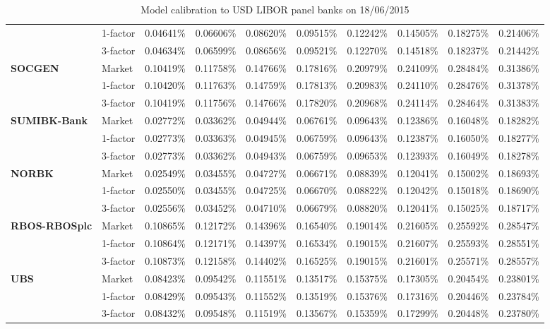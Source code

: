 \documentclass[12pt,a4paper]{article}
\theoremstyle{plain}
\numberwithin{equation}{section}
\begin{document}
\begin{table}[t]
{\begin{tabular}{|rl|cccccccc|}
          & 1-factor & 0.04641\% & 0.06606\% & 0.08620\% & 0.09515\% & 0.12242\% & 0.14505\% & 0.18275\% & 0.21406\% \\
          & 3-factor & 0.04634\% & 0.06599\% & 0.08656\% & 0.09521\% & 0.12270\% & 0.14518\% & 0.18237\% & 0.21442\% \\
    \midrule
    \midrule
    \multicolumn{1}{|l}{\textbf{SOCGEN}} & Market & 0.10419\% & 0.11758\% & 0.14766\% & 0.17816\% & 0.20979\% & 0.24109\% & 0.28484\% & 0.31386\% \\
\cmidrule{3-10}          & 1-factor & 0.10420\% & 0.11763\% & 0.14759\% & 0.17813\% & 0.20983\% & 0.24110\% & 0.28476\% & 0.31378\% \\
          & 3-factor & 0.10419\% & 0.11756\% & 0.14766\% & 0.17820\% & 0.20968\% & 0.24114\% & 0.28464\% & 0.31383\% \\
    \midrule
    \midrule
    \multicolumn{1}{|l}{\textbf{SUMIBK-Bank}} & Market & 0.02772\% & 0.03362\% & 0.04944\% & 0.06761\% & 0.09643\% & 0.12386\% & 0.16048\% & 0.18282\% \\
\cmidrule{3-10}          & 1-factor & 0.02773\% & 0.03363\% & 0.04945\% & 0.06759\% & 0.09643\% & 0.12387\% & 0.16050\% & 0.18277\% \\
          & 3-factor & 0.02773\% & 0.03362\% & 0.04943\% & 0.06759\% & 0.09653\% & 0.12393\% & 0.16049\% & 0.18278\% \\
    \midrule
    \midrule
    \multicolumn{1}{|l}{\textbf{NORBK}} & Market & 0.02549\% & 0.03455\% & 0.04727\% & 0.06671\% & 0.08839\% & 0.12041\% & 0.15002\% & 0.18693\% \\
\cmidrule{3-10}          & 1-factor & 0.02550\% & 0.03455\% & 0.04725\% & 0.06670\% & 0.08822\% & 0.12042\% & 0.15018\% & 0.18690\% \\
          & 3-factor & 0.02556\% & 0.03452\% & 0.04710\% & 0.06679\% & 0.08820\% & 0.12041\% & 0.15025\% & 0.18717\% \\
    \midrule
    \midrule
    \multicolumn{1}{|l}{\textbf{RBOS-RBOSplc}} & Market & 0.10865\% & 0.12172\% & 0.14396\% & 0.16540\% & 0.19014\% & 0.21605\% & 0.25592\% & 0.28547\% \\
\cmidrule{3-10}          & 1-factor & 0.10864\% & 0.12171\% & 0.14397\% & 0.16534\% & 0.19015\% & 0.21607\% & 0.25593\% & 0.28551\% \\
          & 3-factor & 0.10873\% & 0.12158\% & 0.14402\% & 0.16525\% & 0.19015\% & 0.21601\% & 0.25571\% & 0.28557\% \\
    \midrule
    \midrule
    \multicolumn{1}{|l}{\textbf{UBS}} & Market & 0.08423\% & 0.09542\% & 0.11551\% & 0.13517\% & 0.15375\% & 0.17305\% & 0.20454\% & 0.23801\% \\
\cmidrule{3-10}          & 1-factor & 0.08429\% & 0.09543\% & 0.11552\% & 0.13519\% & 0.15376\% & 0.17316\% & 0.20446\% & 0.23784\% \\
          & 3-factor & 0.08432\% & 0.09548\% & 0.11519\% & 0.13567\% & 0.15359\% & 0.17299\% & 0.20448\% & 0.23780\% \\
    \bottomrule
    \end{tabular}%
    }
    \caption{Model calibration to USD LIBOR panel banks on 18/06/2015 }
  \label{CDSfit150618}%
\end{table}%
\end{document}
